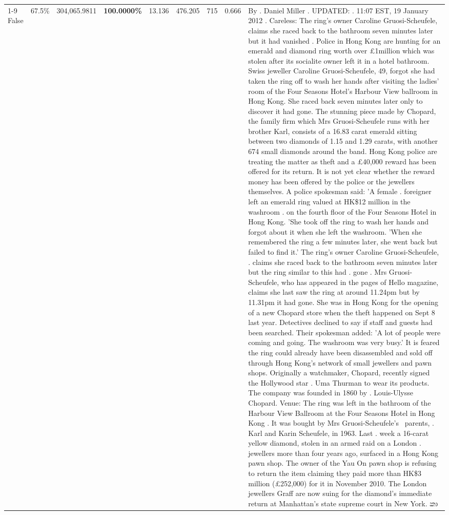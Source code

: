 \begin{table}[H]
\begin{tabular}{lllrlllll}
\cline{1-9}
False & 67.5\% & \color{red} 304,065.9811 & \bfseries \color{red} 100.0000\% & 13.136 & 476.205 & 715 & 0.666 & By . Daniel Miller . UPDATED: . 11:07 EST, 19 January 2012 . Careless: The ring's owner Caroline Gruosi-Scheufele, claims she raced back to the bathroom seven minutes later but it had vanished . Police in Hong Kong are hunting for an emerald and diamond ring worth over £1million which was stolen after its socialite owner left it in a hotel bathroom. Swiss jeweller Caroline Gruosi-Scheufele, 49, forgot she had taken the ring off to wash her hands after visiting the ladies' room of the Four Seasons Hotel's Harbour View ballroom in Hong Kong. She raced back seven minutes later only to discover it had gone. The stunning piece made by Chopard, the family firm which Mrs Gruosi-Scheufele runs with her brother Karl, consists of a 16.83 carat emerald sitting between two diamonds of 1.15 and 1.29 carats, with another 674 small diamonds around the band. Hong Kong police are treating the matter as theft and a £40,000 reward has been offered for its return. It is not yet clear whether the reward money has been offered by the police or the jewellers themselves. A police spokesman said: 'A female . foreigner left an emerald ring valued at HK\$12 million in the washroom . on the fourth floor of the Four Seasons Hotel in Hong Kong. 'She took off the ring to wash her hands and forgot about it when she left the washroom. 'When she remembered the ring a few minutes later, she went back but failed to find it.' The ring's owner Caroline Gruosi-Scheufele, . claims she raced back to the bathroom seven minutes later but the ring similar to this had . gone . Mrs Gruosi-Scheufele, who has appeared in the pages of Hello magazine, claims she last saw the ring at around 11.24pm but by 11.31pm it had gone. She was in Hong Kong for the opening of a new Chopard store when the theft happened on Sept 8 last year. Detectives declined to say if staff and guests had been searched. Their spokesman added: 'A lot of people were coming and going. The washroom was very busy.' It is feared the ring could already have been disassembled and sold off through Hong Kong's network of small jewellers and pawn shops. Originally a watchmaker, Chopard, recently signed the Hollywood star . Uma Thurman to wear its products. The company was founded in 1860 by . Louis-Ulysse Chopard. Venue: The ring was left in the bathroom of the Harbour View Ballroom at the Four Seasons Hotel in Hong Kong . It was bought by Mrs Gruosi-Scheufele's  parents, . Karl and Karin Scheufele, in 1963. Last . week a 16-carat yellow diamond, stolen in an armed raid on a London . jewellers more than four years ago, surfaced in a Hong Kong pawn shop. The owner of the Yau On pawn shop is refusing to return the item claiming they paid more than HK\$3 million (£252,000) for it in November 2010. The London jewellers Graff are now suing for the diamond’s immediate return at Manhattan’s state supreme court in New York. කා \\

\end{tabular}
\end{table}

